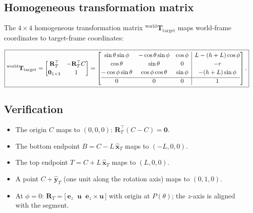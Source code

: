 \documentclass[12pt,a4paper]{article}
\begin{document}
\subsection{Homogeneous transformation matrix}

The $4\times4$ homogeneous transformation matrix
${}^{\text{world}}\mathbf{T}_{\text{target}}$ maps world-frame coordinates to
target-frame coordinates:

\begin{equation}\label{eq:Tmat}
\boxed{
{}^{\text{world}}\mathbf{T}_{\text{target}}
= \begin{bmatrix}
    \mathbf{R}_T^{\top} & -\mathbf{R}_T^{\top}C \\[2pt]
    \mathbf{0}_{1\times 3} & 1
  \end{bmatrix}
= \left[\begin{array}{@{}ccc|c@{}}
    \sin\theta\sin\phi     & -\cos\theta\sin\phi    & \cos\phi
      & L - (h+L)\cos\phi \\[2pt]
    \cos\theta             & \sin\theta             & 0
      & -r \\[2pt]
    -\cos\phi\sin\theta    & \cos\phi\cos\theta     & \sin\phi
      & -(h+L)\sin\phi \\[2pt]
    \hline
    0 & 0 & 0 & 1
  \end{array}\right].
}
\end{equation}

\subsection{Verification}

\begin{itemize}[leftmargin=*]
  \item The origin $C$ maps to $(0,0,0)$: $\mathbf{R}_T^{\top}(C-C)=\mathbf{0}$. 
  \item The bottom endpoint $B = C - L\,\hat{\mathbf{x}}_T$ maps to $(-L,0,0)$. 
  \item The top endpoint $T = C + L\,\hat{\mathbf{x}}_T$ maps to $(L,0,0)$. 
  \item A point $C + \hat{\mathbf{y}}_T$ (one unit along the rotation axis)
    maps to $(0,1,0)$. 
  \item At $\phi=0$: $\mathbf{R}_T = \bigl[\,\mathbf{e}_z \;\; \mathbf{u} \;\; \mathbf{e}_z\!\times\!\mathbf{u}\,\bigr]$
    with origin at $P(\theta)$; the $z$-axis is aligned with the segment. 
\end{itemize}
\end{document}
